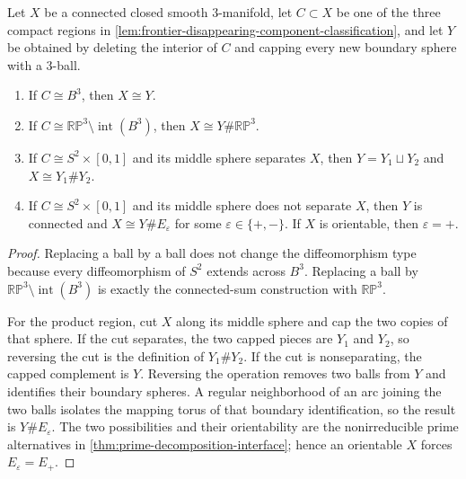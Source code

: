 \begin{lemma}
\label{lem:local-capping-connected-sum-identities}
\notready
Let $X$ be a connected closed smooth $3$-manifold, let $C\subset X$ be one of
the three compact regions in
\ref{lem:frontier-disappearing-component-classification}, and let $Y$ be
obtained by deleting the interior of $C$ and capping every new boundary sphere
with a $3$-ball.
\begin{enumerate}
\item If $C\cong B^3$, then $X\cong Y$.
\item If $C\cong\mathbb{RP}^3\setminus\operatorname{int}(B^3)$, then
  $X\cong Y\#\mathbb{RP}^3$.
\item If $C\cong S^2\times[0,1]$ and its middle sphere separates $X$, then
  $Y=Y_1\sqcup Y_2$ and $X\cong Y_1\#Y_2$.
\item If $C\cong S^2\times[0,1]$ and its middle sphere does not separate $X$,
  then $Y$ is connected and $X\cong Y\#E_\varepsilon$ for some
  $\varepsilon\in\{+,-\}$.  If $X$ is orientable, then $\varepsilon=+$.
\end{enumerate}
\end{lemma}

\begin{proof}
Replacing a ball by a ball does not change the diffeomorphism type because
every diffeomorphism of $S^2$ extends across $B^3$.  Replacing a ball by
$\mathbb{RP}^3\setminus\operatorname{int}(B^3)$ is exactly the connected-sum
construction with $\mathbb{RP}^3$.

For the product region, cut $X$ along its middle sphere and cap the two copies
of that sphere.  If the cut separates, the two capped pieces are $Y_1$ and
$Y_2$, so reversing the cut is the definition of $Y_1\#Y_2$.  If the cut is
nonseparating, the capped complement is $Y$.  Reversing the operation removes
two balls from $Y$ and identifies their boundary spheres.  A regular
neighborhood of an arc joining the two balls isolates the mapping torus of
that boundary identification, so the result is $Y\#E_\varepsilon$.  The two
possibilities and their orientability are the nonirreducible prime alternatives
in \ref{thm:prime-decomposition-interface}; hence an orientable $X$ forces
$E_\varepsilon=E_+$.
\end{proof}

